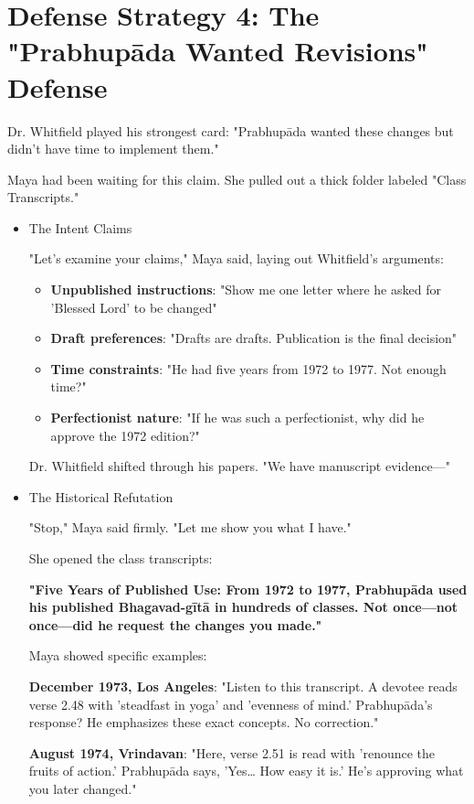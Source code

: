\documentclass[11pt,twoside]{book}
\begin{document}
\section*{Defense Strategy 4: The "Prabhupāda Wanted Revisions" Defense}
\label{sec:orgbb20607}

Dr. Whitfield played his strongest card: "Prabhupāda wanted these changes but didn't have time to implement them."

Maya had been waiting for this claim. She pulled out a thick folder labeled "Class Transcripts."
\begin{itemize}
\item The Intent Claims
\label{sec:orgd617645}

"Let's examine your claims," Maya said, laying out Whitfield's arguments:

\begin{itemize}
\item \textbf{\textbf{Unpublished instructions}}: "Show me one letter where he asked for 'Blessed Lord' to be changed"
\item \textbf{\textbf{Draft preferences}}: "Drafts are drafts. Publication is the final decision"
\item \textbf{\textbf{Time constraints}}: "He had five years from 1972 to 1977. Not enough time?"
\item \textbf{\textbf{Perfectionist nature}}: "If he was such a perfectionist, why did he approve the 1972 edition?"
\end{itemize}

Dr. Whitfield shifted through his papers. "We have manuscript evidence—"
\item The Historical Refutation
\label{sec:orgdecba06}

"Stop," Maya said firmly. "Let me show you what I have."

She opened the class transcripts:

\textbf{\textbf{"Five Years of Published Use: From 1972 to 1977, Prabhupāda used his published Bhagavad-gītā in hundreds of classes. Not once—not once—did he request the changes you made."}}

Maya showed specific examples:

\textbf{\textbf{December 1973, Los Angeles}}: "Listen to this transcript. A devotee reads verse 2.48 with 'steadfast in yoga' and 'evenness of mind.' Prabhupāda's response? He emphasizes these exact concepts. No correction."

\textbf{\textbf{August 1974, Vrindavan}}: "Here, verse 2.51 is read with 'renounce the fruits of action.' Prabhupāda says, 'Yes\ldots{} How easy it is.' He's approving what you later changed."


\end{itemize}
\end{document}
